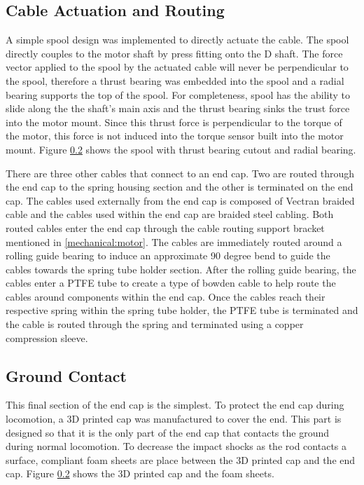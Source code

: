 \subsection{Cable Actuation and Routing}
A simple spool design was implemented to directly actuate the cable. 
The spool directly couples to the motor shaft by press fitting onto the D shaft.
The force vector applied to the spool by the actuated cable will never be perpendicular to the spool, therefore a thrust bearing was embedded into the spool and a radial bearing supports the top of the spool.
For completeness, spool has the ability to slide along the the shaft's main axis and the thrust bearing sinks the trust force into the motor mount.
Since this thrust force is perpendicular to the torque of the motor, this force is not induced into the torque sensor built into the motor mount.
Figure \ref{} shows the spool with thrust bearing cutout and radial bearing.

There are three other cables that connect to an end cap.
Two are routed through the end cap to the spring housing section and the other is terminated on the end cap.
The cables used externally from the end cap is composed of Vectran braided cable and the cables used within the end cap are braided steel cabling. 
Both routed cables enter the end cap through the cable routing support bracket mentioned in \ref{mechanical:motor}.
The cables are immediately routed around a rolling guide bearing to induce an approximate 90 degree bend to guide the cables towards the spring tube holder section.
After the rolling guide bearing, the cables enter a PTFE tube to create a type of bowden cable to help route the cables around components within the end cap.
Once the cables reach their respective spring within the spring tube holder, the PTFE tube is terminated and the cable is routed through the spring and terminated using a copper compression sleeve.

\subsection{Ground Contact} 
This final section of the end cap is the simplest. 
To protect the end cap during locomotion, a 3D printed cap was manufactured to cover the end.
This part is designed so that it is the only part of the end cap that contacts the ground during normal locomotion.
To decrease the impact shocks as the rod contacts a surface, compliant foam sheets are place between the 3D printed cap and the end cap.
Figure \ref{} shows the 3D printed cap and the foam sheets.

